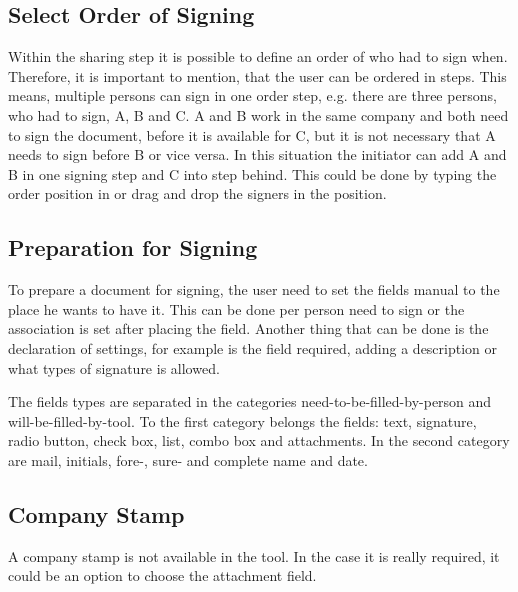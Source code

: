 \subsection{Select Order of Signing}
Within the sharing step it is possible to define an order of who had to sign when. Therefore, it is important to mention, that the user can be ordered in steps. This means, multiple persons can sign in one order step, e.g. there are three persons, who had to sign, A, B and C. A and B work in the same company and both need to sign the document, before it is available for C, but it is not necessary that A needs to sign before B or vice versa. In this situation the initiator can add A and B in one signing step and C into step behind. This could be done by typing the order position in or drag and drop the signers in the position. 

\subsection{Preparation for Signing}
To prepare a document for signing, the user need to set the fields manual to the place he wants to have it. This can be done per person need to sign or the association is set after placing the field. Another thing that can be done is the declaration of settings, for example is the field required, adding a description or what types of signature is allowed.

The fields types are separated in the categories need-to-be-filled-by-person and will-be-filled-by-tool. To the first category belongs the fields: text, signature, radio button, check box, list, combo box and attachments. In the second category are mail, initials, fore-, sure- and complete name and date.

\subsection{Company Stamp}
A company stamp is not available in the tool. In the case it is really required, it could be an option to choose the attachment field.
 
